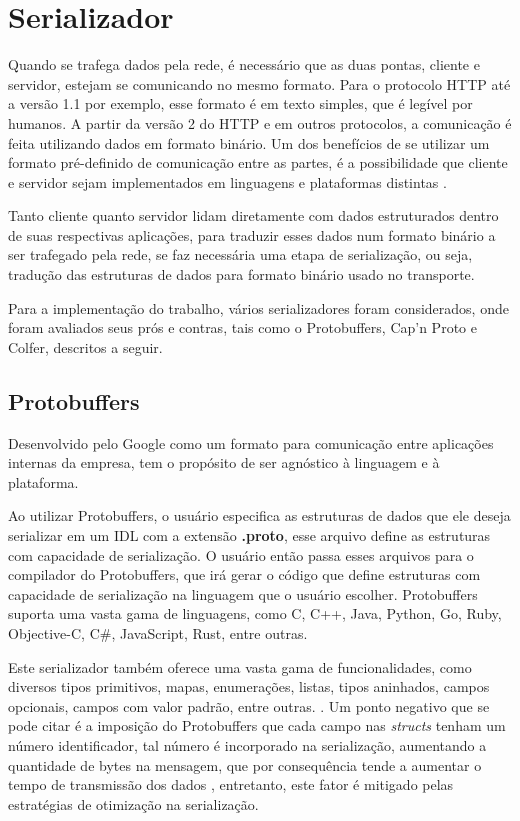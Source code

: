 \section{Serializador}

Quando se trafega dados pela rede, é necessário que as duas pontas, cliente e servidor, estejam se comunicando no mesmo formato. Para o protocolo HTTP até a versão 1.1 por exemplo, esse formato é em texto simples, que é legível por humanos. A partir da versão 2 do HTTP e em outros protocolos, a comunicação é feita utilizando dados em formato binário. Um dos benefícios de se utilizar um formato pré-definido de comunicação entre as partes, é a possibilidade que cliente e servidor sejam implementados em linguagens e plataformas distintas \cite{slee_thrift_nodate}. 

Tanto cliente quanto servidor lidam diretamente com dados estruturados dentro de suas respectivas aplicações, para traduzir esses dados num formato binário a ser trafegado pela rede, se faz necessária uma etapa de serialização, ou seja, tradução das estruturas de dados para formato binário usado no transporte.

Para a implementação do trabalho, vários serializadores foram considerados, onde foram avaliados seus prós e contras, tais como o Protobuffers, Cap'n Proto e Colfer, descritos a seguir.

\subsection{Protobuffers}

Desenvolvido pelo Google como um formato para comunicação entre aplicações internas da empresa, tem o propósito de ser agnóstico à linguagem e à plataforma.

Ao utilizar Protobuffers, o usuário especifica as estruturas de dados que ele deseja serializar em um IDL com a extensão \textbf{.proto}, esse arquivo define as estruturas com capacidade de serialização. O usuário então passa esses arquivos para o compilador do Protobuffers, que irá gerar o código que define estruturas com capacidade de serialização na linguagem que o usuário escolher. Protobuffers suporta uma vasta gama de linguagens, como C, C++, Java, Python, Go, Ruby, Objective-C, C\#, JavaScript, Rust, entre outras.

Este serializador também oferece uma vasta gama de funcionalidades, como diversos tipos primitivos, mapas, enumerações, listas, tipos aninhados, campos opcionais, campos com valor padrão, entre outras. \cite{google_protobuffers_2008}. Um ponto negativo que se pode citar é a imposição do Protobuffers que cada campo nas \textit{structs} tenham um número identificador, tal número é incorporado na serialização, aumentando a quantidade de bytes na mensagem, que por consequência tende a aumentar o tempo de transmissão dos dados \cite{bagci_lightweight_2016}, entretanto, este fator é mitigado pelas estratégias de otimização na serialização.

